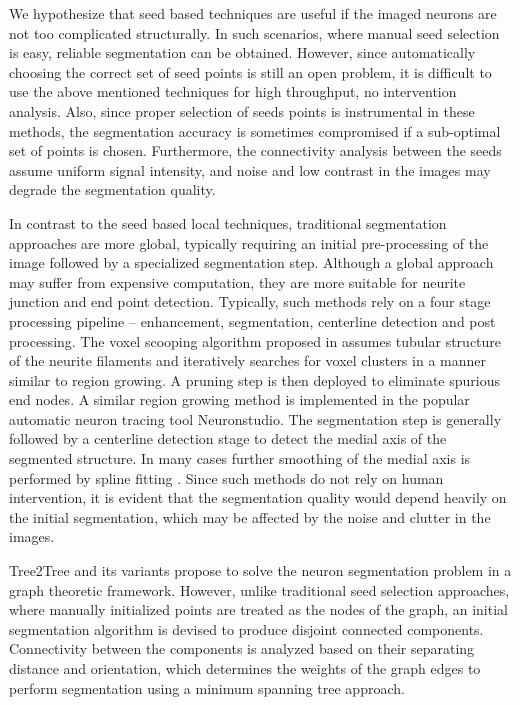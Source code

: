 We hypothesize that seed based techniques are useful if the imaged neurons are not too complicated structurally. In such scenarios, where manual seed selection is easy, reliable segmentation can be obtained. However, since automatically choosing the correct set of seed points is still an open problem, it is difficult to use the above mentioned techniques for high throughput, no intervention analysis. Also, since proper selection of seeds points is instrumental in these methods, the segmentation accuracy is sometimes compromised if a sub-optimal set of points is chosen. Furthermore, the connectivity analysis between the seeds assume uniform signal intensity, and noise and low contrast in the images may degrade the segmentation quality.

In contrast to the seed based local techniques, traditional segmentation approaches are more global, typically requiring an initial pre-processing of the image followed by a specialized segmentation step. Although a global approach may suffer from expensive computation, they are more suitable for neurite junction and end point detection.
Typically, such methods rely on a four stage processing pipeline -- enhancement, segmentation, centerline detection and post processing. The voxel scooping algorithm proposed in \cite{rodriguez_voxelscoop} assumes tubular structure of the neurite filaments and iteratively searches for voxel clusters in a manner similar to region growing. A pruning step is then deployed to eliminate spurious end nodes. A similar region growing method is implemented in the popular automatic neuron tracing tool Neuronstudio\cite{wearne_neuronStudio}. The segmentation step is generally followed by a centerline detection \cite{cuntz_neuron,mukherjee_medialness} stage to detect the medial axis of the segmented structure. In many cases further smoothing of the medial axis is performed by spline fitting \cite{basu_T2T_journal}. Since such methods do not rely on human intervention, it is evident that the segmentation quality would depend heavily on the initial segmentation, which may be affected by the noise and clutter in the images.

Tree2Tree \cite{basu_T2T_journal} and its variants \cite{mukherjee_T2T_2} propose to solve the neuron segmentation problem in a graph theoretic framework. However, unlike traditional seed selection approaches, where manually initialized points are treated as the nodes of the graph, an initial segmentation algorithm is devised to produce disjoint connected components. Connectivity between the components is analyzed based on their separating distance and orientation, which determines the weights of the graph edges to perform segmentation using a minimum spanning tree approach. 

